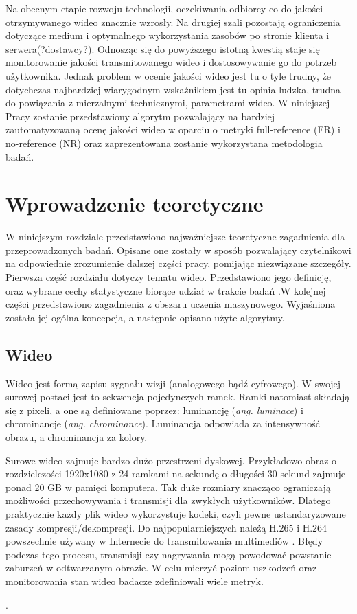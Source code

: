 Na obecnym etapie rozwoju technologii, oczekiwania odbiorcy co do jakości otrzymywanego wideo znacznie wzrosły. Na drugiej szali pozostają ograniczenia dotyczące medium i optymalnego wykorzystania zasobów po stronie klienta i serwera(?dostawcy?). Odnosząc się do powyższego istotną kwestią staje się monitorowanie jakości transmitowanego wideo i dostosowywanie go do potrzeb użytkownika. Jednak problem w ocenie jakości wideo jest tu o tyle trudny, że dotychczas najbardziej wiarygodnym wskaźnikiem jest tu opinia ludzka,  trudna do powiązania z mierzalnymi technicznymi, parametrami wideo. W niniejszej Pracy zostanie przedstawiony algorytm pozwalający na bardziej zautomatyzowaną ocenę jakości wideo w oparciu o metryki full-reference (FR) i no-reference (NR) oraz zaprezentowana zostanie wykorzystana metodologia badań.



\chapter{Wprowadzenie teoretyczne}
\label{cha:pierwszyDokument}

W niniejszym rozdziale przedstawiono najważniejsze teoretyczne zagadnienia dla przeprowadzonych badań. Opisane one zostały w sposób pozwalający czytelnikowi na odpowiednie zrozumienie dalszej części pracy, pomijając niezwiązane szczegóły. Pierwsza część rozdziału dotyczy tematu wideo. Przedstawiono jego definicję, oraz wybrane cechy statystyczne biorące udział w trakcie badań .W kolejnej części przedstawiono zagadnienia z obszaru uczenia maszynowego. Wyjaśniona została jej ogólna koncepcja, a następnie opisano użyte algorytmy.


\section{Wideo}

Wideo jest formą zapisu sygnału wizji (analogowego bądź cyfrowego). W swojej surowej postaci jest to sekwencja pojedynczych ramek. Ramki natomiast składają się z pixeli, a one są definiowane poprzez: luminancję ({\em ang. luminace}) i chrominancje ({\em ang. chrominance}). Luminancja odpowiada za intensywność obrazu, a chrominancja za kolory. 

Surowe wideo zajmuje bardzo dużo przestrzeni dyskowej. Przykładowo obraz o rozdzielczości 1920x1080 z 24 ramkami na sekundę o długości 30 sekund zajmuje ponad 20 GB w pamięci komputera. Tak duże rozmiary znacząco ograniczają możliwości przechowywania i transmisji dla zwykłych użytkowników. Dlatego praktycznie każdy plik wideo wykorzystuje kodeki, czyli pewne ustandaryzowane zasady kompresji/dekompresji. Do najpopularniejszych należą H.265 i H.264 powszechnie używany w Internecie do transmitowania multimediów \cite{video_codecs}. Błędy podczas tego procesu, transmisji czy nagrywania mogą powodować powstanie zaburzeń w odtwarzanym obrazie. W celu mierzyć poziom uszkodzeń oraz monitorowania stan wideo badacze zdefiniowali wiele metryk.\par.

